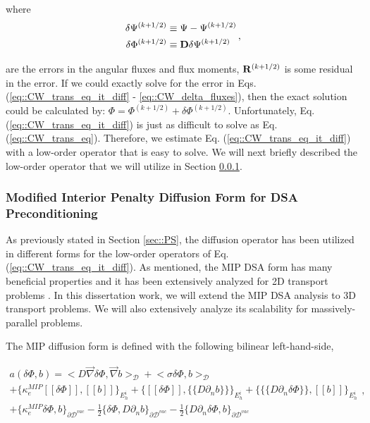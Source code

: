 \documentclass[11pt]{article}
\begin{document}
\noindent where
\begin{equation}
\label{eq::CW_delta_fluxes}
\begin{aligned}
\delta \Psi^{(k+1/2)} &\equiv  \Psi - \Psi^{(k+1/2)} \\
\delta \Phi^{(k+1/2)} &\equiv {\bf D} \delta \Psi^{(k+1/2)}
\end{aligned} \, ,
\end{equation}

\noindent are the errors in the angular fluxes and flux moments, ${\bf R}^{(k+1/2)}$ is some residual in the error. If we could exactly solve for the error in Eqs. (\ref{eq::CW_trans_eq_it_diff} - \ref{eq::CW_delta_fluxes}), then the exact solution could be calculated by: $\Phi =  \Phi^{(k+1/2)} + \delta \Phi^{(k+1/2)}$. Unfortunately, Eq. (\ref{eq::CW_trans_eq_it_diff}) is just as difficult to solve as Eq. (\ref{eq::CW_trans_eq}). Therefore, we estimate Eq. (\ref{eq::CW_trans_eq_it_diff}) with a low-order operator that is easy to solve. We will next briefly described the low-order operator that we will utilize in Section \ref{sec::CW_DSA_MIP}.


\subsubsection{Modified Interior Penalty Diffusion Form for DSA Preconditioning}
\label{sec::CW_DSA_MIP}

As previously stated in Section \ref{sec::PS}, the diffusion operator has been utilized in different forms for the low-order operators of Eq. (\ref{eq::CW_trans_eq_it_diff}). As mentioned, the MIP DSA form has many beneficial properties and it has been extensively analyzed for 2D transport problems \cite{ref::DSA_wang_ragusa,turcksin2014discontinuous}. In this dissertation work, we will extend the MIP DSA analysis to 3D transport problems. We will also extensively analyze its scalability for massively-parallel problems.

The MIP diffusion form is defined with the following bilinear left-hand-side,

\begin{equation}
\label{eq::mip_lhs}
\begin{aligned}
a(\delta \Phi, b)  = \Big<  D \vec{\nabla} \delta  \Phi , \vec{\nabla} b \Big>_{\mathcal{D}} + \Big<  \sigma \delta  \Phi , b  \Big>_{\mathcal{D}}    \\
+  \Big\{ \kappa_e^{MIP} [\![ \delta  \Phi ]\!] , [\![  b ]\!]\Big\}_{E_h^i} + \Big\{  [\![  \delta \Phi ]\!] , \{\!\{  D \partial_n b \}\!\}\Big\}_{E_h^i}  + \Big\{ \{\!\{  D \partial_n \delta \Phi \}\!\} , [\![ b ]\!]\Big\}_{E_h^i} \\
+ \Big\{ \kappa_e^{MIP}  \delta \Phi ,   b \Big\}_{\partial \mathcal{D}^{vac}} - \frac{1}{2} \Big\{  \delta \Phi  ,  D \partial_n b \Big\}_{\partial \mathcal{D}^{vac}} - \frac{1}{2} \Big\{   D \partial_n \delta  \Phi , b \Big\}_{\partial \mathcal{D}^{vac}}  
\end{aligned} ,
\end{equation}
\end{document}
